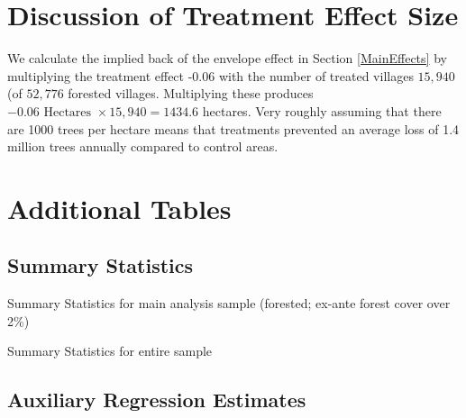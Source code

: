 \documentclass[12pt,reqno]{article}
\begin{document}
\begin{refsection}

\newpage

\section{Discussion of Treatment Effect Size\label{treat_size}}
We calculate the implied back of the envelope effect in Section \ref{MainEffects} by multiplying the treatment effect -0.06 with the number of treated villages $15,940$ (of $52,776$ forested villages. Multiplying these produces $-0.06 \text{ Hectares } \times 15,940 = 1434.6$ hectares. Very roughly assuming that there are 1000 trees per hectare means that treatments prevented an average loss of 1.4 million trees annually compared to control areas.


\newpage
\section{Additional Tables}

\footnotesize

\subsection{Summary Statistics} %
\label{ssub:summary_statistics}

\begin{centering}
\begin{table}[!htbp] \centering
  \caption{Summary Statistics for main analysis sample (forested; ex-ante forest cover over 2\%)}
    \label{table:sumstats0}
    \scalebox{0.9}{
    
    }
\end{table}
\end{centering}


\begin{centering}
\begin{table}[!htbp] \centering
  \caption{Summary Statistics for entire sample}
  \label{table:sumstats1}
  \scalebox{0.9}{
    
    }
\end{table}
\end{centering}



\pagebreak

\normalsize

\subsection{Auxiliary Regression Estimates \label{sub:auxreg}}


\end{refsection}
\end{document}
